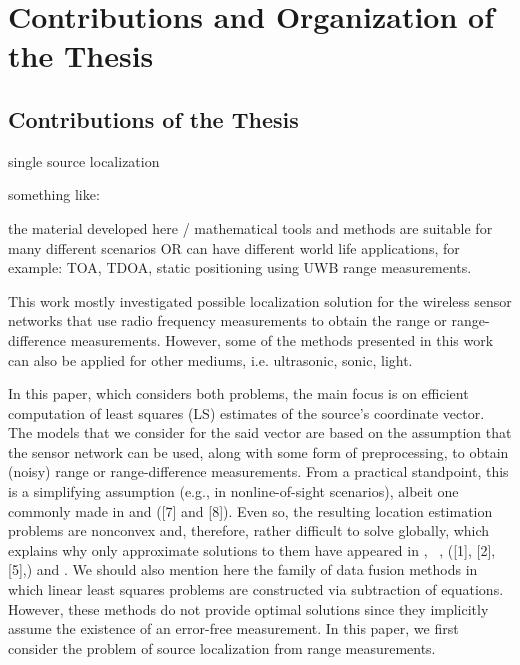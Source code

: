 %
%
% 
%
%
%
%

\section{Contributions and Organization of the Thesis}

\subsection{Contributions  of the Thesis} \label{contributions}


single source localization

something like:

the material developed here / mathematical tools and methods are suitable for many different scenarios 
OR
can have different world life applications, for example: TOA, TDOA, static positioning using UWB range measurements. 

This work mostly investigated possible localization solution for the wireless sensor networks that use radio frequency measurements to obtain the range or range-difference measurements. However, some of the methods presented in this work can also be applied for other mediums, i.e. ultrasonic, sonic, light. 

In this paper, which considers both problems, the main focus is on efficient computation of least squares (LS) estimates of the source’s coordinate vector. The models that we consider for the said vector are based on  the assumption that the sensor network can be used, along with some form of preprocessing, to obtain (noisy) range or range-difference measurements. From a practical standpoint, this is a simplifying assumption (e.g., in nonline-of-sight scenarios), albeit one commonly made in \cite{Cheung} and \cite{classMDS} ([7] and [8]). Even so, the resulting location estimation problems are nonconvex and, therefore, rather difficult to solve globally, which explains why only approximate solutions to them have appeared in \cite{SmithAbel}, ~, \cite{LiHu} ([1], [2], [5],) and \cite{Cheung}. We should also mention here the family of data fusion methods \cite{Sayed} in which linear least squares problems are constructed via subtraction of equations. However, these methods do not provide optimal solutions since they implicitly assume the existence of an error-free measurement. In this paper, we first consider the problem of source localization from range measurements. 



